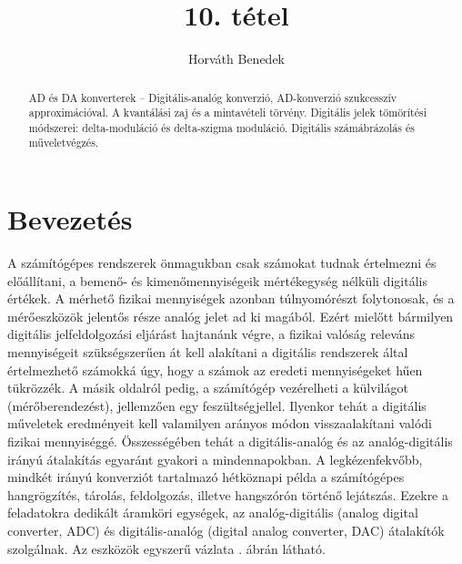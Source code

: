 \documentclass[12pt]{article}
\theoremstyle{plain}
\begin{document}
\title{10. tétel}
\author{Horváth Benedek}

\maketitle


\newpage
\begin{abstract}
    AD és DA konverterek – Digitális-analóg konverzió, AD-konverzió szukcesszív approximációval. A kvantálási zaj és a mintavételi törvény. Digitális jelek tömörítési módszerei: delta-moduláció és delta-szigma moduláció. Digitális számábrázolás és műveletvégzés.
\end{abstract}

\section{Bevezetés}

A számítógépes rendszerek önmagukban csak számokat tudnak értelmezni és előállítani, a bemenő- és kimenőmennyiségeik mértékegység nélküli digitális értékek. A mérhető fizikai mennyiségek azonban túlnyomórészt folytonosak, és a mérőeszközök jelentős része analóg jelet ad ki magából. Ezért mielőtt bármilyen digitális jelfeldolgozási eljárást hajtanánk végre, a fizikai valóság releváns mennyiségeit szükségszerűen át kell alakítani a digitális rendszerek által értelmezhető számokká úgy, hogy a számok az eredeti mennyiségeket hűen tükrözzék. A másik oldalról pedig, a számítógép vezérelheti a külvilágot (mérőberendezést), jellemzően egy feszültségjellel. Ilyenkor tehát a digitális műveletek eredményeit kell valamilyen arányos módon visszaalakítani valódi fizikai mennyiséggé. Összességében tehát a digitális-analóg és az analóg-digitális irányú átalakítás egyaránt gyakori a mindennapokban. A legkézenfekvőbb, mindkét irányú konverziót tartalmazó hétköznapi példa a számítógépes hangrögzítés, tárolás, feldolgozás, illetve hangszórón történő lejátszás. Ezekre a feladatokra dedikált áramköri egységek, az analóg-digitális (analog digital converter, ADC) és digitális-analóg (digital analog converter, DAC) átalakítók szolgálnak. Az eszközök egyszerű vázlata . ábrán látható. 
\end{document}
